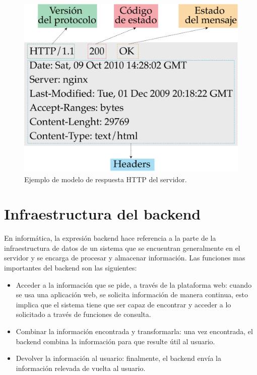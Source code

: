\begin{figure}[htpb]
	\centering
	\includegraphics[scale=.50]{./Figures/respuesta-http.png}
	\caption[Modelo de respuesta HTTP ]{Ejemplo de modelo de respuesta HTTP del servidor.}
	\label{fig:respuesta-http}
\end{figure}


\section{Infraestructura del backend}

En informática, la expresión backend hace referencia a la parte de la infraestructura de datos de un sistema que se encuentran generalmente en el servidor y se encarga de procesar y almacenar información.  Las funciones mas importantes del backend son las siguientes:

\begin{itemize}
	\item Acceder a la información que se pide, a través de la plataforma web: cuando se usa una aplicación web, se solicita información de manera continua, esto implica que el sistema tiene que ser capaz de encontrar y acceder a lo solicitado a través de funciones de consulta. 
	
	\item Combinar la información encontrada y transformarla: una vez encontrada, el backend combina la información para que resulte útil al usuario.
	
	\item Devolver la información al usuario:  finalmente, el backend envía la información relevada de vuelta al usuario. 
	
\end{itemize}


